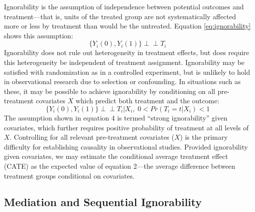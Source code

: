 \documentclass [11pt, proquest] {uwthesis}[2015/03/03]
\begin{document}
Ignorability is the assumption of independence between potential outcomes and treatment---that is, units of the treated group are not systematically affected more or less by treatment than would be the untreated. Equation \eqref{eq:ignorability} shows this assumption:
\begin{equation}
\{Y_i(0), Y_i(1)\} \perp\!\!\!\perp T_i
\label{eq:ignorability}
\end{equation}
Ignorability does not rule out heterogeneity in treatment effects, but does require this heterogeneity be independent of treatment assignment. Ignorability may be satisfied with randomization as in a controlled experiment, but is unlikely to hold in observational research due to selection or confounding. In situations such as these, it may be possible to achieve ignorability by conditioning on all pre-treatment covariates \(X\) which predict both treatment and the outcome:
\begin{equation}
\{Y_i(0), Y_i(1)\} \perp\!\!\!\perp T_i | X_i,\; 0 < Pr(T_i = t | X_i) < 1
\label{eq:strongignorability}
\end{equation}
The assumption shown in equation 4 is termed ``strong ignorability'' given covariates, which further requires positive probability of treatment at all levels of \(X\). Controlling for all relevant pre-treatment covariates (\(X\)) is the primary difficulty for establishing causality in observational studies. Provided ignorability given covariates, we may estimate the conditional average treatment effect (CATE) as the expected value of equation 2---the average difference between treatment groups conditional on covariates.

\hypertarget{mediation-and-sequential-ignorability}{%
\subsection{Mediation and Sequential Ignorability}\label{mediation-and-sequential-ignorability}}
\end{document}
